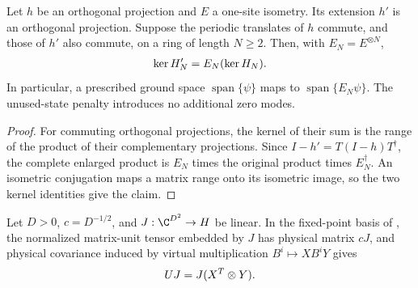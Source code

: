 \begin{lemma}
    \label{thm:spt_isometric_interaction_ground_space}
    \leanok
    Let $h$ be an orthogonal projection and $E$ a one-site isometry.
    Its extension $h'$ is an orthogonal projection.
    Suppose the periodic translates of $h$ commute, and those of
    $h'$ also commute, on a ring of length $N\ge2$.
    Then, with $E_N=E^{\otimes N}$,
    \begin{align}
        \ker H'_N=E_N(\ker H_N).
        \notag
    \end{align}
    In particular, a prescribed ground space $\operatorname{span}\{\psi\}$
    maps to $\operatorname{span}\{E_N\psi\}$.
    The unused-state penalty introduces no additional zero modes.
\end{lemma}

\begin{proof}\leanok
    For commuting orthogonal projections, the kernel of their sum
    is the range of the product of their complementary projections.
    Since $I-h'=T(I-h)T^\dagger$, the complete enlarged product
    is $E_N$ times the original product times $E_N^\dagger$.
    An isometric conjugation maps a matrix range onto its isometric
    image, so the two kernel identities give the claim.
\end{proof}

\begin{lemma}
    \label{thm:spt_normalized_fixed_point_frame}
    \leanok
    Let $D>0$, $c=D^{-1/2}$, and $J:\C^{D^2}\to H$ be linear.
    In the fixed-point basis of \cite[Section~II.F.2]{Schuch2011Phases},
    the normalized matrix-unit tensor embedded by $J$ has physical
    matrix $cJ$, and physical covariance induced by virtual
    multiplication $B^i\mapsto XB^iY$ gives
    \begin{align}
        UJ=J(X^T\otimes Y).
        \notag
    \end{align}
\end{lemma}

